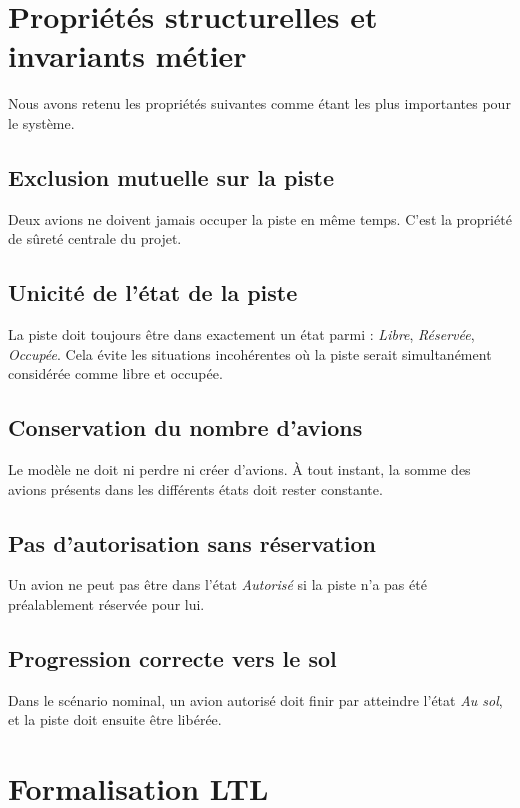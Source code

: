 \documentclass[11pt,a4paper]{article}
\begin{document}
\section{Propriétés structurelles et invariants métier}

Nous avons retenu les propriétés suivantes comme étant les plus importantes pour le système.

\subsection{Exclusion mutuelle sur la piste}

Deux avions ne doivent jamais occuper la piste en même temps. C'est la propriété de sûreté centrale du projet.

\subsection{Unicité de l'état de la piste}

La piste doit toujours être dans exactement un état parmi : \emph{Libre}, \emph{Réservée}, \emph{Occupée}. Cela évite les situations incohérentes où la piste serait simultanément considérée comme libre et occupée.

\subsection{Conservation du nombre d'avions}

Le modèle ne doit ni perdre ni créer d'avions. À tout instant, la somme des avions présents dans les différents états doit rester constante.

\subsection{Pas d'autorisation sans réservation}

Un avion ne peut pas être dans l'état \emph{Autorisé} si la piste n'a pas été préalablement réservée pour lui.

\subsection{Progression correcte vers le sol}

Dans le scénario nominal, un avion autorisé doit finir par atteindre l'état \emph{Au sol}, et la piste doit ensuite être libérée.

\section{Formalisation LTL}
\end{document}
